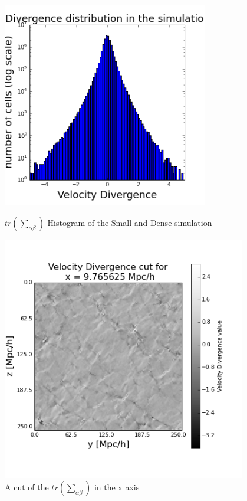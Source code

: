 \documentclass[12pt]{article}
\begin{document}
\begin{figure}[ht]
\centering
\begin{minipage}{.5\textwidth}
  \centering
  \includegraphics[width=0.8\textwidth]{simulation/Trace_hist_sim.png} %
\caption{$tr \left(\sum_{\alpha\beta}\right)$ Histogram of the Small and Dense simulation}
\label{fg:hist_Trace}
\end{minipage}%
\begin{minipage}{.5\textwidth}
  \centering
  \includegraphics[width=0.95\textwidth]{simulation/Trace_cut_i_10.png}
  \caption{A cut of the $tr \left(\sum_{\alpha\beta}\right)$ in the x axis}
\label{fg:cut_Trace}
\end{minipage}
\end{figure}
\FloatBarrier
\end{document}
